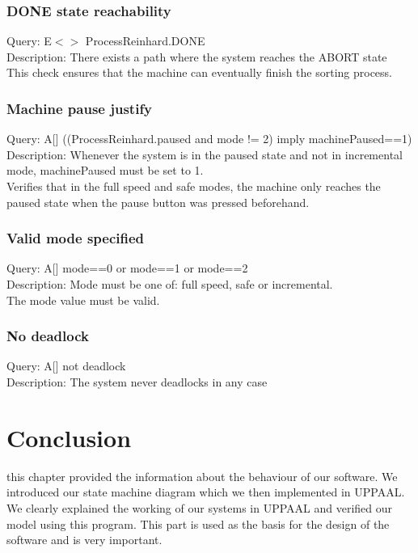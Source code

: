 \documentclass[a4paper,oneside,11pt]{article}
\begin{document}
\subsubsection{DONE state reachability}
Query: E$<>$ ProcessReinhard.DONE \\
Description: There exists a path where the system reaches the ABORT state \\
This check ensures that the machine can eventually finish the sorting process.

\subsubsection{Machine pause justify}
Query: A[] ((ProcessReinhard.paused and mode != 2) imply machinePaused==1) \\
Description: Whenever the system is in the paused state and not in incremental mode, machinePaused must be set to 1. \\
Verifies that in the full speed and safe modes, the machine only reaches the paused state when the pause button was pressed beforehand.

\subsubsection{Valid mode specified}
Query: A[] mode==0 or mode==1 or mode==2 \\
Description: Mode must be one of: full speed, safe or incremental. \\
The mode value must be valid.

\subsubsection{No deadlock}
Query: A[] not deadlock \\
Description: The system never deadlocks in any case \\

\section{Conclusion}
this chapter provided the information about the behaviour of our software. We introduced our state machine diagram which we then implemented in UPPAAL. We clearly explained the working of our systems in UPPAAL and verified our model using this program. This part is used as the basis for the design of the software and is very important.
\end{document}
